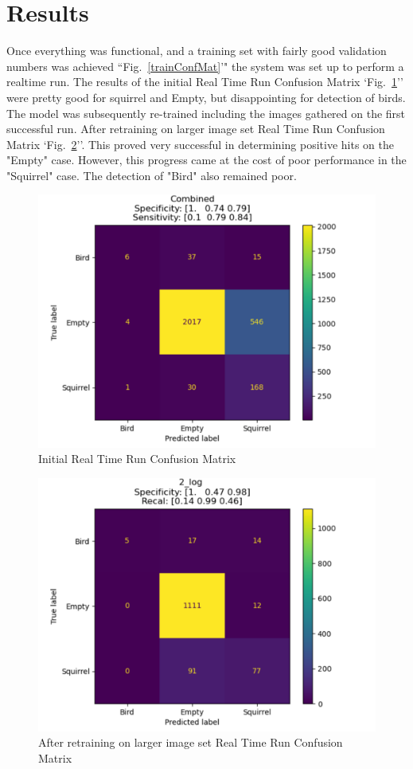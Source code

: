 \documentclass[conference]{IEEEtran}
\begin{document}
\section{Results}\label{SCM}
Once everything was functional, and a training set with fairly good validation numbers was achieved ``Fig.~\ref{trainConfMat}'" the system was set up to perform a realtime run. The results of the initial Real Time Run Confusion Matrix `Fig.~\ref{rt1ConfMat}'' were pretty good for squirrel and Empty, but disappointing for detection of birds.  The model was subsequently re-trained including the images gathered on the first successful run. After retraining on larger image set Real Time Run Confusion Matrix `Fig.~\ref{rt2ConfMat}''. This proved very successful in determining positive hits on the "Empty" case. However, this progress came at the cost of poor performance in the "Squirrel" case. The detection of "Bird" also remained poor.
\begin{figure}[htbp]
\centerline{\includegraphics[scale=0.06]{initialRunConfMat.png}}
\caption{Initial Real Time Run Confusion Matrix}
\label{rt1ConfMat}
\end{figure}
\begin{figure}[htbp]
\centerline{\includegraphics[scale=0.06]{afterReTrainConfMat.png}}
\caption{After retraining on larger image set Real Time Run Confusion Matrix}
\label{rt2ConfMat}
\end{figure}
\end{document}
